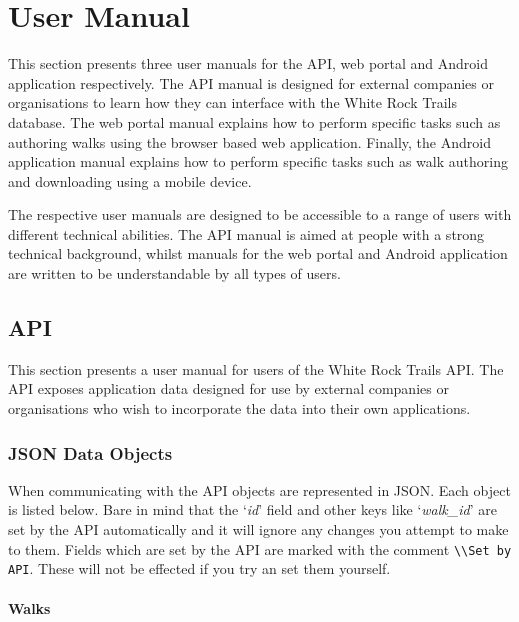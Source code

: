 \documentclass[11pt,a4paper]{report}
\begin{document}
\chapter{User Manual}
\label{sec:user-manual}

This section presents three user manuals for the API, web portal and Android application respectively. The API manual is designed for external companies or organisations to learn how they can interface with the White Rock Trails database. The web portal manual explains how to perform specific tasks such as authoring walks using the browser based web application. Finally, the Android application manual explains how to perform specific tasks such as walk authoring and downloading using a mobile device.

The respective user manuals are designed to be accessible to a range of users with different technical abilities. The API manual is aimed at people with a strong technical background, whilst manuals for the web portal and Android application are written to be understandable by all types of users. 

\newpage

\section{API}

This section presents a user manual for users of the White Rock Trails API. The API exposes application data designed for use by external companies or organisations who wish to incorporate the data into their own applications.

\subsection{JSON Data Objects}

When communicating with the API objects are represented in JSON. Each object is listed below. Bare in mind that the `\textit{id}' field and other keys like `\textit{walk\_id}' are set by the API automatically and it will ignore any changes you attempt to make to them. Fields which are set by the API are marked with the comment \lstinline$\\Set by API$. These will not be effected if you try an set them yourself. 

\subsubsection{Walks}
\end{document}
